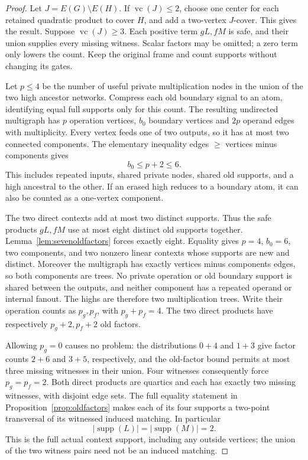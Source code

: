 \documentclass[11pt]{article}
\newcommand{\supp}{\operatorname{supp}}
\newcommand{\vc}{\operatorname{vc}}
\theoremstyle{definition}
\theoremstyle{remark}
\begin{document}
\begin{proof}
Let $J=E(G)\setminus E(H)$. If $\vc(J)\le2$, choose one center
for each retained quadratic product to cover $H$, and add a two-vertex
$J$-cover. This gives the result. Suppose $\vc(J)\ge3$.
Each positive term $gL,fM$ is safe, and their union supplies every missing
witness. Scalar factors may be omitted; a zero term only lowers the count.
Keep the original frame and count supports without changing its gates.

Let $p\le4$ be the number of useful private multiplication nodes in the
union of the two high ancestor networks. Compress each old boundary
signal to an atom, identifying equal full supports only for this count.
The resulting undirected multigraph has $p$ operation vertices, $b_0$
boundary vertices and $2p$ operand edges with multiplicity. Every vertex
feeds one of two outputs, so it has at most two connected components.
The elementary inequality edges $\ge$ vertices minus components gives
\[
 b_0\le p+2\le6.
\]
This includes repeated inputs, shared private nodes, shared old supports,
and a high ancestral to the other. If an erased high reduces to a boundary
atom, it can also be counted as a one-vertex component.

The two direct contexts add at most two distinct supports. Thus the safe
products $gL,fM$ use at most eight distinct old supports together.
Lemma~\ref{lem:sevenoldfactors} forces exactly eight. Equality gives
$p=4$, $b_0=6$, two components, and two nonzero linear contexts whose
supports are new and distinct. Moreover the multigraph has exactly
vertices minus components edges, so both components are trees.
No private operation or old boundary support is shared between the
outputs, and neither component has a repeated operand or internal
fanout. The highs are therefore two multiplication trees.
Write their operation counts as $p_g,p_f$, with $p_g+p_f=4$.
The two direct products have respectively $p_g+2,p_f+2$ old factors.

Allowing $p_g=0$ causes no problem: the distributions $0+4$ and $1+3$
give factor counts $2+6$ and $3+5$, respectively, and the old-factor
bound permits at most three missing witnesses in their union.
Four witnesses consequently force $p_g=p_f=2$.
Both direct products are quartics and each has exactly two missing
witnesses, with disjoint edge sets. The full equality statement in
Proposition~\ref{prop:oldfactors} makes each of its four supports a
two-point transversal of its witnessed induced matching. In particular
\[
 |\supp(L)|=|\supp(M)|=2.
\]
This is the full actual context support, including any outside vertices;
the union of the two witness pairs need not be an induced matching.


\end{proof}
\end{document}
